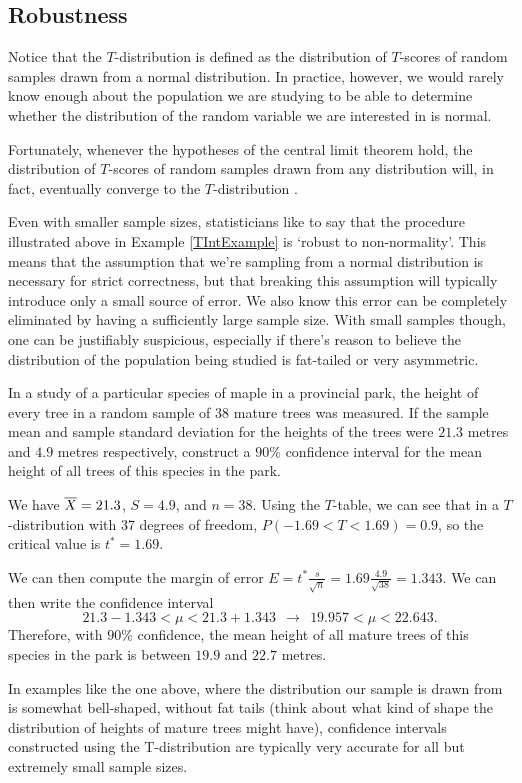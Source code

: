 \subsection*{Robustness}
Notice that the $T$-distribution is defined as the distribution of $T$-scores of random samples drawn from a normal distribution. In practice, however, we would rarely know enough about the population we are studying to be able to determine whether the distribution of the random variable we are interested in is normal.
\par
Fortunately, whenever the hypotheses of the central limit theorem hold, the distribution of $T$-scores of random samples drawn from any distribution will, in fact, eventually converge to the $T$-distribution \cite{AsymptoticTDist}. 
\par
Even with smaller sample sizes, statisticians like to say that the procedure illustrated above in Example \ref{TIntExample} is `robust to non-normality'. This means that the assumption that we're sampling from a normal distribution is necessary for strict correctness, but that breaking this assumption will typically introduce only a small source of error. We also know this error can be completely eliminated by having a sufficiently large sample size. With small samples though, one can be justifiably suspicious, especially if there's reason to believe the distribution of the population being studied is fat-tailed or very asymmetric.
\par
\begin{examp}
In a study of a particular species of maple in a provincial park, the height of every tree in a random sample of 38 mature trees was measured. If the sample mean and sample standard deviation for the heights of the trees were $21.3$ metres and $4.9$ metres respectively, construct a $90\%$ confidence interval for the mean height of all trees of this species in the park.
\par
\noindent We have ${\overline{X}} = 21.3$, $S = 4.9$, and $n = 38$. Using the $T$-table, we can see that in a $T$-distribution with 37 degrees of freedom, $P(-1.69 < T < 1.69) = 0.9$, so the critical value is $t^* = 1.69$.
\par
\noindent
We can then compute the margin of error $E = t^* \frac{s}{\sqrt{n}} = 1.69 \frac{4.9}{\sqrt{38}} = 1.343$. We can then write the confidence interval
$$21.3-1.343 < \mu < 21.3+1.343 \ \ \rightarrow \ \ 19.957 < \mu < 22.643.$$
Therefore, with $90\%$ confidence, the mean height of all mature trees of this species in the park is between $19.9$ and $22.7$ metres.
\end{examp}
\par
In examples like the one above, where the distribution our sample is drawn from is somewhat bell-shaped, without fat tails (think about what kind of shape the distribution of heights of mature trees might have), confidence intervals constructed using the T-distribution are typically very accurate for all but extremely small sample sizes.









